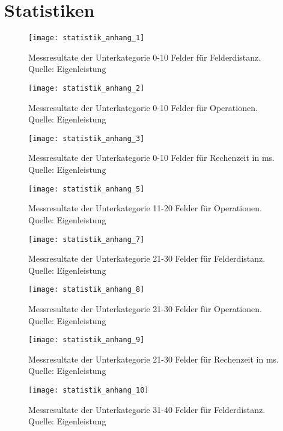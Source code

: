 \section{Statistiken}
\begin{figure}[H]
  \centering
  \texttt{[image: statistik\_anhang\_1]}
  \caption[Messresultate der Unterkategorie 0-10 Felder für Felderdistanz.]{Messresultate der Unterkategorie 0-10 Felder für Felderdistanz. Quelle: Eigenleistung}
\end{figure}
\begin{figure}[H]
  \centering
  \texttt{[image: statistik\_anhang\_2]}
  \caption[Messresultate der Unterkategorie 0-10 Felder für Operationen.]{Messresultate der Unterkategorie 0-10 Felder für Operationen. Quelle: Eigenleistung}
\end{figure}
\begin{figure}[H]
  \centering
  \texttt{[image: statistik\_anhang\_3]}
  \caption[Messresultate der Unterkategorie 0-10 Felder für Rechenzeit in ms.]{Messresultate der Unterkategorie 0-10 Felder für Rechenzeit in ms. Quelle: Eigenleistung}
\end{figure}
\begin{figure}[H]
  \centering
  \texttt{[image: statistik\_anhang\_5]}
  \caption[Messresultate der Unterkategorie 11-20 Felder für Operationen.]{Messresultate der Unterkategorie 11-20 Felder für Operationen. Quelle: Eigenleistung}
\end{figure}
\begin{figure}[H]
  \centering
  \texttt{[image: statistik\_anhang\_7]}
  \caption[Messresultate der Unterkategorie 21-30 Felder für Felderdistanz.]{Messresultate der Unterkategorie 21-30 Felder für Felderdistanz. Quelle: Eigenleistung}
\end{figure}
\begin{figure}[H]
  \centering
  \texttt{[image: statistik\_anhang\_8]}
  \caption[Messresultate der Unterkategorie 21-30 Felder für Operationen.]{Messresultate der Unterkategorie 21-30 Felder für Operationen. Quelle: Eigenleistung}
\end{figure}
\begin{figure}[H]
  \centering
  \texttt{[image: statistik\_anhang\_9]}
  \caption[Messresultate der Unterkategorie 21-30 Felder für Rechenzeit in ms.]{Messresultate der Unterkategorie 21-30 Felder für Rechenzeit in ms. Quelle: Eigenleistung}
\end{figure}
\begin{figure}[H]
  \centering
  \texttt{[image: statistik\_anhang\_10]}
  \caption[Messresultate der Unterkategorie 31-40 Felder für Felderdistanz.]{Messresultate der Unterkategorie 31-40 Felder für Felderdistanz. Quelle: Eigenleistung}
\end{figure}

